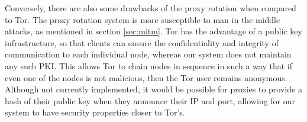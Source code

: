Conversely, there are also some drawbacks of the proxy rotation when compared to Tor. The proxy rotation system is more susceptible to man in the middle attacks, as mentioned in section \ref{sec:mitm}. Tor has the advantage of a public key infrastructure, so that clients can ensure the confidentiality and integrity of communication to each individual node, whereas our system does not maintain any such PKI. This allows Tor to chain nodes in sequence in such a way that if even one of the nodes is not malicious, then the Tor user remains anonymous. Although not currently implemented, it would be possible for proxies to provide a hash of their public key when they announce their IP and port, allowing for our system to have security properties closer to Tor's.